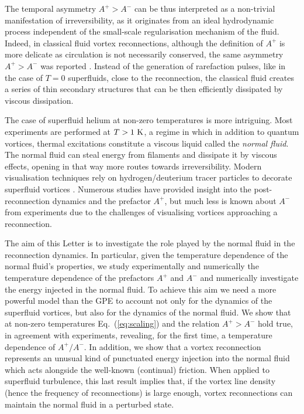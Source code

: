 \documentclass[%
 reprint,
unsortedaddress,
 amsmath,amssymb,
 aps,
 prl,
]{revtex4-2}
\begin{document}
The temporal asymmetry $A^+>A^-$ can be thus interpreted as a non-trivial manifestation of irreversibility, as it originates from an ideal hydrodynamic process independent of the small-scale regularisation mechanism of the fluid.
%
Indeed, in classical fluid vortex reconnections, although the definition of $A^+$ is more delicate as circulation is not necessarily conserved, the same asymmetry $A^+>A^-$ was reported \cite{yaoSeparationScalingViscous2020}. Instead of the generation of rarefaction pulses, like in the case of $T=0$ superfluids, close to the reconnection, the classical fluid creates a series of thin secondary structures that can be then efficiently dissipated by viscous dissipation.

The case of superfluid helium at non-zero temperatures
is more intriguing. Most experiments are performed at $T>1~\rm K$, a regime in which in addition to quantum vortices, thermal excitations constitute a viscous liquid called the {\it normal fluid}. The normal fluid can steal energy from filaments and dissipate it by viscous effects, opening in that way more routes towards irreversibility. Modern visualisation techniques rely on hydrogen/deuterium tracer particles to decorate superfluid vortices \cite{paoletti2008velocity,bewley2008,guo2014visualization,perettiDirectVisualizationQuantum2023}. Numerous studies have provided insight into the post-reconnection dynamics and the prefactor $A^{+}$, but much less is known about $A^-$ from experiments due to the challenges of visualising vortices approaching a reconnection.

The aim of this Letter is to investigate the role played by the normal fluid in the reconnection dynamics. In particular, given the temperature dependence of the normal fluid's properties, we study experimentally and numerically the temperature dependence of the prefactors $A^+$ and $A^-$ and numerically investigate the energy injected in the normal fluid. 
%
To achieve this aim we need a more powerful model than the GPE to account not only for the dynamics of the
superfluid vortices, but also for the dynamics of the normal fluid. 
We show that at non-zero temperatures Eq.~(\ref{eq:scaling}) and the
relation $A^+>A^-$ hold true, in agreement with experiments, revealing, for the 
first time, a temperature dependence of $A^+/A^-$. In addition, we
show that a vortex
reconnection represents an unusual kind of
punctuated energy injection into the normal fluid which acts alongside
the well-known (continual) friction.
When applied to superfluid turbulence, this last result implies that,
if the vortex line density (hence the frequency of reconnections) 
is large enough, vortex
reconnections can maintain the normal fluid in a perturbed state.
\end{document}
